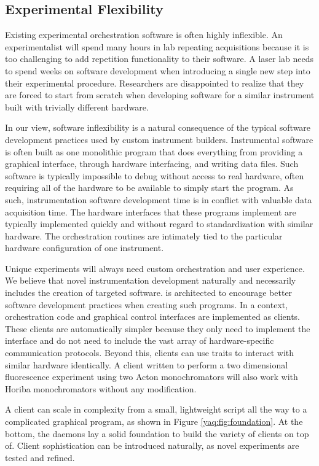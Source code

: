 \subsection{Experimental Flexibility}

Existing experimental orchestration software is often highly inflexible.
An experimentalist will spend many hours in lab repeating acquisitions because it is too challenging to add repetition functionality to their software.
A laser lab needs to spend weeks on software development when introducing a single new step into their experimental procedure.
Researchers are disappointed to realize that they are forced to start from scratch when developing software for a similar instrument built with trivially different hardware.

In our view, software inflexibility is a natural consequence of the typical software development practices used by custom instrument builders.
Instrumental software is often built as one monolithic program that does everything from providing a graphical interface, through hardware interfacing, and writing data files.
Such software is typically impossible to debug without access to real hardware, often requiring all of the hardware to be available to simply start the program.
As such, instrumentation software development time is in conflict with valuable data acquisition time.
The hardware interfaces that these programs implement are typically implemented quickly and without regard to standardization with similar hardware.
The orchestration routines are intimately tied to the particular hardware configuration of one instrument.


Unique experiments will always need custom orchestration and user experience.
We believe that novel instrumentation development naturally and necessarily includes the creation of targeted software.
\yaq{} is architected to encourage better software development practices when creating such programs.
In a \yaq{} context, orchestration code and graphical control interfaces are implemented as clients.
These clients are automatically simpler because they only need to implement the \yaq{} interface and do not need to include the vast array of hardware-specific communication protocols.
Beyond this, clients can use traits to interact with similar hardware identically.
A client written to perform a two dimensional fluorescence experiment using two Acton monochromators will also work with Horiba monochromators without any modification.

A \yaq{} client can scale in complexity from a small, lightweight script all the way to a complicated graphical program, as shown in Figure \ref{yaq:fig:foundation}.
At the bottom, the daemons lay a solid foundation to build the variety of clients on top of.
Client sophistication can be introduced naturally, as novel experiments are tested and refined.

